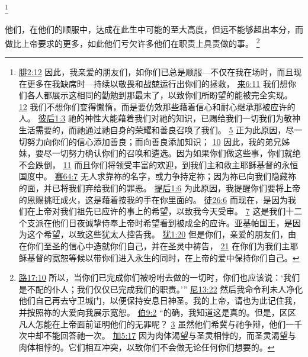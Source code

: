\documentclass[12pt, a4paper, oneside]{ctexart}
\newcounter{parnum}[section]
\newcommand{\N}{%
   \noindent\refstepcounter{parnum}%
    \makebox[\parindent][l]{\textbf{\arabic{parnum}.}}}
\begin{document}
	\footnote {
		\href{https://biblehub.com/philippians/2-12.htm}{腓2:12} 因此，我亲爱的朋友们，如你们已总是顺服---不仅在我在场时，而且现在更多在我缺席时---持续以敬畏和战兢运行出你们的拯救，
		\href{https://biblehub.com/hebrews/6-11.htm}{来6:11} 我们想你们各人都展示这相同的勤勉到那最末了，以致你们所盼望的能被完全实现。
		\href{https://biblehub.com/hebrews/6-12.htm}{12} 我们不想你们变得懒惰，而是要仿效那些藉着信心和耐心继承那被应许的人。
		\href{https://biblehub.com/2_peter/1-3.htm}{彼后1:3} 祂的神性大能藉着我们对祂的知识，已赐给我们一切我们为敬神生活需要的，而祂通过祂自身的荣耀和善良召唤了我们。
		\href{https://biblehub.com/2_peter/1-5.htm}{5} 正为此原因，尽一切努力向你们的信心添加善良；而向善良添加知识；
		\href{https://biblehub.com/2_peter/1-10.htm}{10} 因此，我的弟兄姊妹，要尽一切努力确认你们的召唤和遴选。因为如果你们做这些事，你们就绝不会跌倒，
		\href{https://biblehub.com/2_peter/1-11.htm}{11} 而且你们将领受丰富的欢迎，到我们主和救主耶稣基督的永恒国度中。
		\href{https://biblehub.com/isaiah/64-7.htm}{赛64:7} 无人求靠祢的名字，或力争持定祢；因为祢已向我们隐藏祢的面，并已将我们弃给我们的罪恶。
		\href{https://biblehub.com/2_timothy/1-6.htm}{提后1:6} 为此原因，我提醒你们要将上帝的恩赐挑旺成火，这是藉着按我的手在你里面的。
		\href{https://biblehub.com/acts/26-6.htm}{徒26:6} 而现在，是因为我们在上帝对我们祖先已应许的事上的希望，以致我今天受审。
		\href{https://biblehub.com/acts/26-7.htm}{7} 这是我们十二个支派在他们日夜诚挚侍奉上帝时希望看到被成全的应许。亚基帕国王，是因为这个希望，以致这些犹太人控告我。
		\href{https://biblehub.com/jude/1-20.htm}{犹1:20} 但是你们，亲爱的朋友们，由在你们至圣的信心中造就你们自己，并在圣灵中祷告，
		\href{https://biblehub.com/jude/1-21.htm}{21} 在你们为我们主耶稣基督的宽恕等候以带你们进入永生的同时，在上帝的爱中保持你们自己。
	}

\N 他们，在他们的顺服中，达成在此生中可能的至大高度，但远不能够超出本分，而做比上帝要求的更多，如此他们亏欠许多他们在职责上具责做的事。
	\footnote {
		\href{https://biblehub.com/luke/17-10.htm}{路17:10} 所以，当你们已完成你们被吩咐去做的一切时，你们也应该说：‘我们是不配的仆人；我们仅仅已完成我们的职责。’”
		\href{https://biblehub.com/nehemiah/13-22.htm}{尼13:22} 然后我命令利未人净化他们自己再去守卫城门，以便保持安息日神圣。我的上帝，请也为此记住我，并按照祢的大爱向我展示宽恕。
		\href{https://biblehub.com/job/9-2.htm}{伯9:2} “的确，我知道这是真的。但是，区区凡人怎能在上帝面前证明他们的无罪呢？
		\href{https://biblehub.com/job/9-3.htm}{3} 虽然他们希冀与祂争辩，他们一千次中却不能回答祂一次。
		\href{https://biblehub.com/galatians/5-17.htm}{加5:17} 因为肉体渴望与圣灵相悖的，而圣灵渴望与肉体相悖的。它们相互冲突，以致你们不会做无论任何你们想要的。
	}
\end{document}
